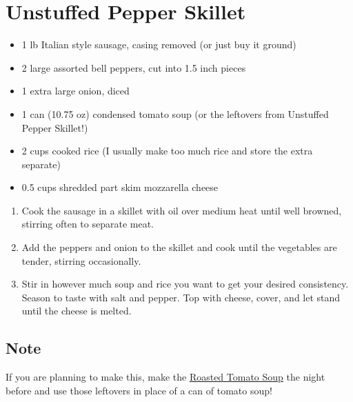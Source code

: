 \section{Unstuffed Pepper Skillet}
\label{loc:unstuffed_pepper}

\begin{itemize}
\item 1 lb Italian style sausage, casing removed (or just buy it ground)
\item 2 large assorted bell peppers, cut into 1.5 inch pieces
\item 1 extra large onion, diced
\item 1 can (10.75 oz) condensed tomato soup (or the leftovers from Unstuffed Pepper Skillet!)
\item 2 cups cooked rice (I usually make too much rice and store the extra separate)
\item 0.5 cups shredded part skim mozzarella cheese
\end{itemize}

\begin{enumerate}
\item Cook the sausage in a skillet with oil over medium heat until well browned, stirring often to separate meat.
\item Add the peppers and onion to the skillet and cook until the vegetables are tender, stirring occasionally.
\item Stir in however much soup and rice you want to get your desired consistency. Season to taste with salt and pepper.
    Top with cheese, cover, and let stand until the cheese is melted.
\end{enumerate}

\subsection{Note}

If you are planning to make this, make the \hyperref[loc:tomato_soup]{Roasted Tomato Soup} the night before and use
those leftovers in place of a can of tomato soup!
